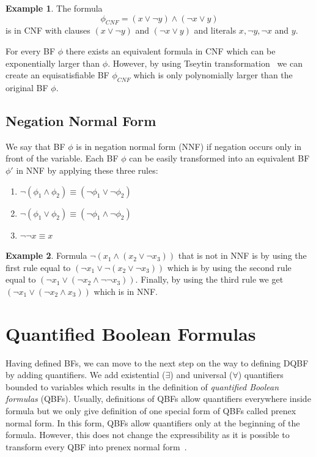 \documentclass[
  digital, %
  twoside, %
  table,   %
  nolof,     %
  nolot,     %
]{fithesis3}
\theoremstyle{definition}
\newtheorem{example}{Example}
\theoremstyle{remark}
\begin{document}
\begin{example}
The formula
\[\phi_{CNF} = (x \lor \neg y) \land (\neg x \lor y)\]
is in CNF with clauses $(x \lor \neg y)$ and $(\neg x \lor y)$ and literals $x,\neg y, \neg x$ and $y$.
\end{example}

For every BF $\phi$ there exists an equivalent formula in CNF which can be exponentially larger than $\phi$. However, by using Tseytin transformation~\cite{Tseitin} we can create an equisatisfiable BF $\phi_{CNF}$ which is only polynomially larger than the original BF $\phi$.

\subsection{Negation Normal Form}
\label{sec:BF:NNF}
We say that BF $\phi$ is in negation normal form (NNF) if negation occurs only in front of the variable. Each BF $\phi$ can be easily transformed into an equivalent BF $\phi'$ in NNF by applying these three rules:
\begin{enumerate}
    \item $\neg(\phi_1 \land \phi_2) \equiv (\neg\phi_1 \lor \neg\phi_2)$ 
    \item $\neg(\phi_1 \lor \phi_2) \equiv (\neg\phi_1 \land \neg\phi_2)$
    \item $\neg\neg x \equiv x$
\end{enumerate}
\begin{example}
Formula $\neg (x_1 \land (x_2 \lor \neg x_3))$ that is not in NNF is by using the first rule equal to $(\neg x_1 \lor \neg(x_2 \lor \neg x_3))$ which is by using the second rule equal to $(\neg x_1 \lor (\neg x_2 \land \neg\neg x_3))$. Finally, by using the third rule we get $(\neg x_1 \lor (\neg x_2 \land x_3))$ which is in NNF.
\end{example}

\section{Quantified Boolean Formulas}
Having defined BFs, we can move to the next step on the way to defining DQBF by adding quantifiers. We add existential (${\exists}$) and universal (${\forall}$) quantifiers bounded to variables which results in the definition of \emph{quantified Boolean formulas} (QBFs). Usually, definitions of QBFs allow quantifiers everywhere inside formula but we only give definition of one special form of QBFs called prenex normal form. In this form, QBFs allow quantifiers only at the beginning of the formula. However, this does not change the expressibility as it is possible to transform every QBF into prenex normal form~\cite{prenexingQBFs}.
\end{document}
